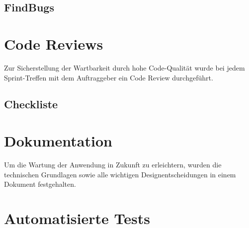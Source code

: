 \clearpage
\subsection{FindBugs}



\clearpage


\section{Code Reviews}

Zur Sicherstellung der Wartbarkeit durch hohe Code-Qualität wurde bei jedem
Sprint-Treffen mit dem Auftraggeber ein Code Review durchgeführt.


\subsection{Checkliste}






\clearpage
\section{Dokumentation}

Um die Wartung der Anwendung in Zukunft zu erleichtern, wurden die technischen Grundlagen
sowie alle wichtigen Designentscheidungen in einem Dokument festgehalten.






\clearpage
\section{Automatisierte Tests}


